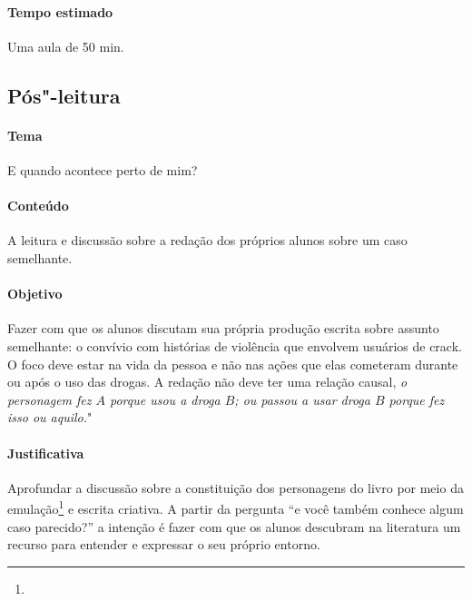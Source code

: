 \documentclass[12pt]{extarticle}
\begin{document}
\paragraph{Tempo estimado} Uma aula de 50 min. 


\subsection{Pós"-leitura}

\paragraph{Tema} E quando acontece perto de mim? 
\paragraph{Conteúdo} A leitura e discussão sobre a redação dos 
	próprios alunos sobre um caso semelhante. 
\paragraph{Objetivo} Fazer com que os alunos discutam sua própria produção escrita 
	sobre assunto semelhante: o convívio com histórias de violência que 
	envolvem usuários de crack. O foco deve estar na vida da pessoa e não 
	nas ações que elas cometeram durante ou após o uso das drogas. 
	A redação não deve ter uma relação causal, \textit{o personagem fez $A$ 
	porque usou a droga $B$; ou passou a usar droga $B$ porque fez isso ou aquilo.}"
\paragraph{Justificativa} Aprofundar a discussão sobre a constituição dos personagens 
	do livro por meio da emulação\footnote{} e escrita criativa. A partir 
	da pergunta ``e você também conhece algum caso parecido?'' a intenção 
	é fazer com que os alunos descubram na literatura um recurso para 
	entender e expressar o seu próprio entorno.
\end{document}
